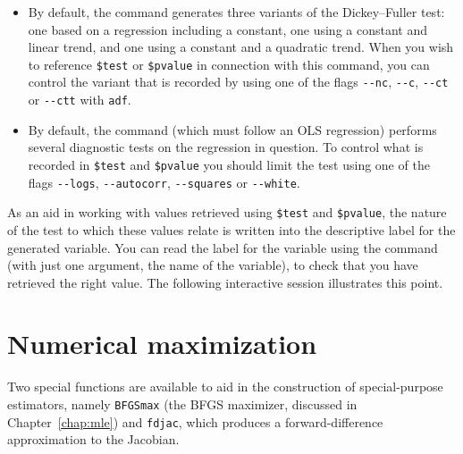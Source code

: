 \begin{itemize}
\item By default, the  command generates three variants of
  the Dickey--Fuller test: one based on a regression including a
  constant, one using a constant and linear trend, and one using a
  constant and a quadratic trend.  When you wish to reference
  \verb+$test+ or \verb+$pvalue+ in connection with this command, you
  can control the variant that is recorded by using one of the flags
  \verb+--nc+, \verb+--c+, \verb+--ct+ or \verb+--ctt+ with
  \verb+adf+.
\item By default, the  command (which must follow an OLS
  regression) performs several diagnostic tests on the regression in
  question.  To control what is recorded in \verb+$test+ and
  \verb+$pvalue+ you should limit the test using one of the flags
  \verb+--logs+, \verb+--autocorr+, \verb+--squares+ or
  \verb+--white+.
\end{itemize}

As an aid in working with values retrieved using \verb+$test+ and
\verb+$pvalue+, the nature of the test to which these values relate is
written into the descriptive label for the generated variable.  You
can read the label for the variable using the  command
(with just one argument, the name of the variable), to check that you
have retrieved the right value.  The following interactive session
illustrates this point.



\section{Numerical maximization}
\label{genr-numerical}

Two special functions are available to aid in the construction of
special-purpose estimators, namely \texttt{BFGSmax} (the BFGS
maximizer, discussed in Chapter~\ref{chap:mle}) and \texttt{fdjac},
which produces a forward-difference approximation to the Jacobian.

